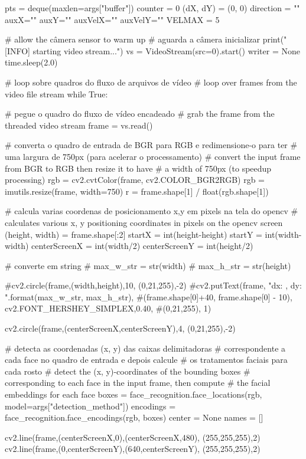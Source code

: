 \begin{apendicesenv}
\begin{python_}
pts = deque(maxlen=args["buffer"])
counter = 0
(dX, dY) = (0, 0)
direction = ""
auxX=""
auxY=""
auxVelX=""
auxVelY=""
VELMAX = 5


# allow the câmera sensor to warm up
# aguarda a câmera inicializar
print("[INFO] starting video stream...")
vs = VideoStream(src=0).start()
writer = None
time.sleep(2.0)

# loop sobre quadros do fluxo de arquivos de vídeo
# loop over frames from the video file stream
while True:

	# pegue o quadro do fluxo de vídeo encadeado
	# grab the frame from the threaded video stream
	frame = vs.read()
	
	# converta o quadro de entrada de BGR para RGB e redimensione-o para ter
	# uma largura de 750px (para acelerar o processamento)
	# convert the input frame from BGR to RGB then resize it to have
	# a width of 750px (to speedup processing)
	rgb = cv2.cvtColor(frame, cv2.COLOR_BGR2RGB)
	rgb = imutils.resize(frame, width=750)
	r = frame.shape[1] / float(rgb.shape[1])
	
	# calcula varias coordenas de posicionamento x,y em pixels na tela do opencv
	# calculates various x, y positioning coordinates in pixels on the opencv screen
	(height, width) = frame.shape[:2]
	startX = int(height-height)
	startY = int(width-width)
	centerScreenX = int(width/2)
	centerScreenY = int(height/2)
	
	# converte em string
	# max_w_str = str(width)
	# max_h_str = str(height) 
	
	#cv2.circle(frame,(width,height),10, (0,21,255),-2)
	#cv2.putText(frame, "dx: {}, dy: {}".format(max_w_str, max_h_str),
	#(frame.shape[0]+40, frame.shape[0] - 10), cv2.FONT_HERSHEY_SIMPLEX,0.40, 
	#(0,21,255), 1)
	
	cv2.circle(frame,(centerScreenX,centerScreenY),4, (0,21,255),-2)
	
	# detecta as coordenadas (x, y) das caixas delimitadoras
	# correspondente a cada face no quadro de entrada e depois calcule
	# os tratamentos faciais para cada rosto
	# detect the (x, y)-coordinates of the bounding boxes
	# corresponding to each face in the input frame, then compute
	# the facial embeddings for each face
	boxes = face_recognition.face_locations(rgb, model=args["detection_method"])
	encodings = face_recognition.face_encodings(rgb, boxes)
	center = None
	names = []	
	
	cv2.line(frame,(centerScreenX,0),(centerScreenX,480), (255,255,255),2) 
	cv2.line(frame,(0,centerScreenY),(640,centerScreenY), (255,255,255),2) 
	

\end{python_}
\end{apendicesenv}
